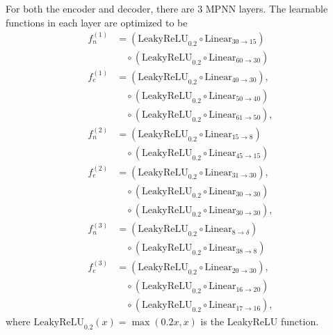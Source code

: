 For both the encoder and decoder, there are $3$ MPNN layers.
The learnable functions in each layer are optimized to be
\begin{equation}
    \begin{split}
        f_n^{(1)} &= (
        \mathrm{LeakyReLU}_{0.2}
        \circ
        \mathrm{Linear}_{30\to 15}) \\
        &\quad \circ
        (\mathrm{LeakyReLU}_{0.2}
        \circ
        \mathrm{Linear}_{60\to 30}) \\
        f_e^{(1)} &=
        (\mathrm{LeakyReLU}_{0.2}
        \circ
        \mathrm{Linear}_{40\to 30}), \\
        &\quad \circ
        (\mathrm{LeakyReLU}_{0.2}
        \circ
        \mathrm{Linear}_{50\to 40}) \\
        &\quad \circ
        (\mathrm{LeakyReLU}_{0.2}
        \circ
        \mathrm{Linear}_{61\to 50}),
    \end{split}
\end{equation}
\begin{equation}
    \begin{split}
        f_n^{(2)} &= (
        \mathrm{LeakyReLU}_{0.2}
        \circ
        \mathrm{Linear}_{15\to 8}) \\
        &\quad \circ
        (\mathrm{LeakyReLU}_{0.2}
        \circ
        \mathrm{Linear}_{45\to 15}) \\
        f_e^{(2)} &=
        (\mathrm{LeakyReLU}_{0.2}
        \circ
        \mathrm{Linear}_{31\to 30}), \\
        &\quad \circ
        (\mathrm{LeakyReLU}_{0.2}
        \circ
        \mathrm{Linear}_{30\to 30}) \\
        &\quad \circ
        (\mathrm{LeakyReLU}_{0.2}
        \circ
        \mathrm{Linear}_{30\to 30}),
    \end{split}
\end{equation}
\begin{equation}
    \begin{split}
        f_n^{(3)} &= (
        \mathrm{LeakyReLU}_{0.2}
        \circ
        \mathrm{Linear}_{8 \to \delta}) \\
        &\quad \circ
        (\mathrm{LeakyReLU}_{0.2}
        \circ
        \mathrm{Linear}_{38\to 8}) \\
        f_e^{(3)} &=
        (\mathrm{LeakyReLU}_{0.2}
        \circ
        \mathrm{Linear}_{20\to 30}), \\
        &\quad \circ
        (\mathrm{LeakyReLU}_{0.2}
        \circ
        \mathrm{Linear}_{16\to 20}) \\
        &\quad \circ
        (\mathrm{LeakyReLU}_{0.2}
        \circ
        \mathrm{Linear}_{17\to 16}),
    \end{split}
\end{equation}
where $\mathrm{LeakyReLU}_{0.2}(x) = \max(0.2 x, x)$ is the LeakyReLU function.


